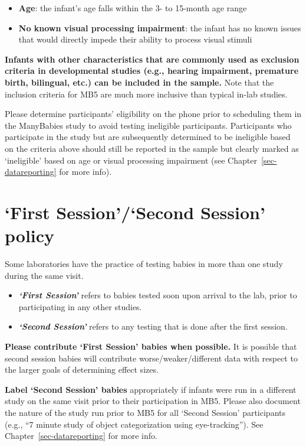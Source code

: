 \documentclass[
  letterpaper,
  DIV=11,
  numbers=noendperiod,
  oneside]{scrreprt}
\providecommand{\tightlist}{%
  \setlength{\itemsep}{0pt}\setlength{\parskip}{0pt}}
\begin{document}
\begin{itemize}
\tightlist
\item
  \textbf{Age}: the infant's age falls within the 3- to 15-month age
  range
\item
  \textbf{No known visual processing impairment}: the infant has no
  known issues that would directly impede their ability to process
  visual stimuli
\end{itemize}

\textbf{Infants with other characteristics that are commonly used as
exclusion criteria in developmental studies (e.g., hearing impairment,
premature birth, bilingual, etc.) can be included in the sample.} Note
that the inclusion criteria for MB5 are much more inclusive than typical
in-lab studies.

Please determine participants' eligibility on the phone prior to
scheduling them in the ManyBabies study to avoid testing ineligible
participants. Participants who participate in the study but are
subsequently determined to be ineligible based on the criteria above
should still be reported in the sample but clearly marked as
`ineligible' based on age or visual processing impairment (see
Chapter~\ref{sec-datareporting} for more info).

\section{`First Session'/`Second Session'
policy}\label{first-sessionsecond-session-policy}

Some laboratories have the practice of testing babies in more than one
study during the same visit.

\begin{itemize}
\tightlist
\item
  \textbf{\emph{`First Session'}} refers to babies tested soon upon
  arrival to the lab, prior to participating in any other studies.
\item
  \textbf{\emph{`Second Session'}} refers to any testing that is done
  after the first session.
\end{itemize}

\textbf{Please contribute `First Session' babies when possible.} It is
possible that second session babies will contribute
worse/weaker/different data with respect to the larger goals of
determining effect sizes.

\textbf{Label `Second Session' babies} appropriately if infants were run
in a different study on the same visit prior to their participation in
MB5. Please also document the nature of the study run prior to MB5 for
all `Second Session' participants (e.g., ``7 minute study of object
categorization using eye-tracking''). See
Chapter~\ref{sec-datareporting} for more info.
\end{document}
